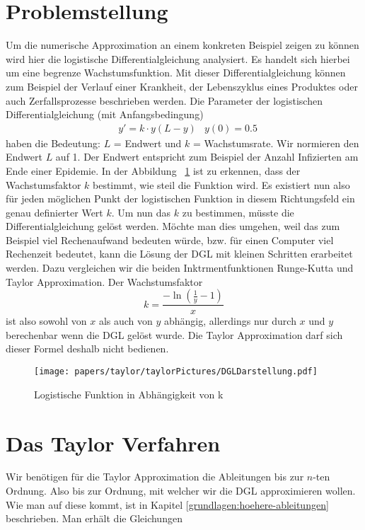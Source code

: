 %
%
%
\section{Problemstellung
\label{taylor:section:problemstellung}}
Um die numerische Approximation an einem konkreten Beispiel zeigen zu können wird hier die logistische Differentialgleichung analysiert.
Es handelt sich hierbei um eine begrenze Wachstumsfunktion. 
Mit dieser Differentialgleichung können zum Beispiel der Verlauf einer Krankheit, der Lebenszyklus eines Produktes oder auch Zerfallsprozesse beschrieben werden. Die Parameter der logistischen Differentialgleichung (mit Anfangsbedingung)
\begin{align*}
	&y' = k\cdot y(L-y) 
	&y(0) = 0.5
	\label{taylor:section:logistifunction}
\end{align*}
haben die Bedeutung: $L$ = Endwert und $k$ = Wachstumsrate.
Wir normieren den Endwert $L$ auf 1.
Der Endwert entspricht zum Beispiel der Anzahl Infizierten am Ende einer Epidemie.
In der Abbildung ~\ref{taylor:section:fig:DGLDarstellung} ist zu erkennen, dass der Wachstumsfaktor $k$ bestimmt, wie steil die Funktion wird.
Es existiert nun also für jeden möglichen Punkt der logistischen Funktion in diesem Richtungsfeld ein genau definierter Wert $k$.
Um nun das $k$ zu bestimmen, müsste die Differentialgleichung gelöst werden.
Möchte man dies umgehen, weil das zum Beispiel viel Rechenaufwand bedeuten würde, bzw. für einen Computer viel Rechenzeit bedeutet, kann die Lösung der DGL mit kleinen Schritten erarbeitet werden.
Dazu vergleichen wir die beiden Inktrmentfunktionen Runge-Kutta und Taylor Approximation.
Der Wachstumsfaktor
\begin{equation}
k=\frac{-\ln{(\frac{1}{y}-1)}}{x}
\end{equation}
ist also sowohl von $x$ als auch von $y$ abhängig, allerdings nur durch $x$ und $y$ berechenbar wenn die DGL gelöst wurde.
Die Taylor Approximation darf sich dieser Formel deshalb nicht bedienen.

\begin{figure}
	\centering
	\texttt{[image: papers/taylor/taylorPictures/DGLDarstellung.pdf]}
	\caption{Logistische Funktion in Abhängigkeit von k}
	\label{taylor:section:fig:DGLDarstellung}
\end{figure}

\section{Das Taylor Verfahren}
\label{taylor:subsection:Vorgehen}
Wir benötigen für die Taylor Approximation die Ableitungen bis zur $n$-ten Ordnung.
Also bis zur Ordnung, mit welcher wir die DGL approximieren wollen.
Wie man auf diese kommt, ist in Kapitel \ref{grundlagen:hoehere-ableitungen} beschrieben.
Man erhält die Gleichungen

